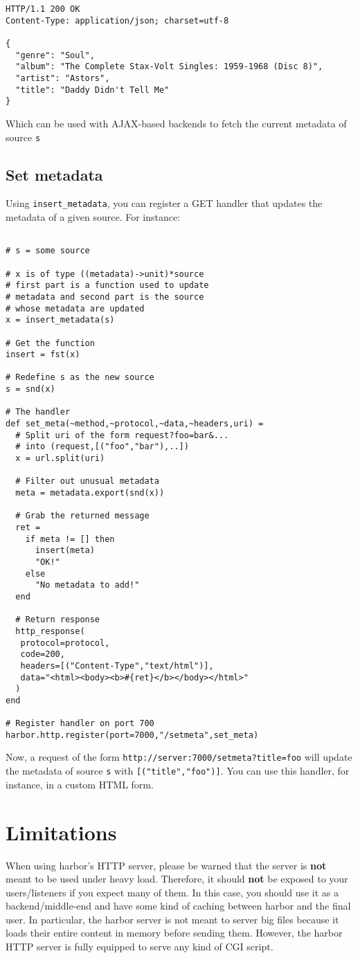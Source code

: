 \begin{verbatim}
HTTP/1.1 200 OK
Content-Type: application/json; charset=utf-8

{
  "genre": "Soul",
  "album": "The Complete Stax-Volt Singles: 1959-1968 (Disc 8)",
  "artist": "Astors",
  "title": "Daddy Didn't Tell Me"
}
\end{verbatim}
Which can be used with AJAX-based backends to fetch the current 
metadata of source \verb+s+

\subsection{Set metadata}
Using \verb+insert_metadata+, you can register a GET handler that
updates the metadata of a given source. For instance:

\begin{verbatim}

# s = some source

# x is of type ((metadata)->unit)*source
# first part is a function used to update
# metadata and second part is the source 
# whose metadata are updated
x = insert_metadata(s)

# Get the function
insert = fst(x)

# Redefine s as the new source
s = snd(x)

# The handler
def set_meta(~method,~protocol,~data,~headers,uri) =
  # Split uri of the form request?foo=bar&...
  # into (request,[("foo","bar"),..])
  x = url.split(uri)

  # Filter out unusual metadata
  meta = metadata.export(snd(x))
  
  # Grab the returned message
  ret =
    if meta != [] then
      insert(meta)
      "OK!"
    else
      "No metadata to add!"
  end

  # Return response
  http_response(
   protocol=protocol,
   code=200,
   headers=[("Content-Type","text/html")],
   data="<html><body><b>#{ret}</b></body></html>"
  )
end

# Register handler on port 700
harbor.http.register(port=7000,"/setmeta",set_meta)
\end{verbatim}
Now, a request of the form \verb+http://server:7000/setmeta?title=foo+
will update the metadata of source \verb+s+ with \verb+[("title","foo")]+. You
can use this handler, for instance, in a custom HTML form.

\section{Limitations}
When using harbor's HTTP server, please be warned that the server is 
\textbf{not} meant to be used under heavy load. Therefore, it should \textbf{not}
be exposed to your users/listeners if you expect many of them. In this
case, you should use it as a backend/middle-end and have some kind of 
caching between harbor and the final user. In particular, the harbor server
is not meant to server big files because it loads their entire content in 
memory before sending them. However, the harbor HTTP server is fully equipped 
to serve any kind of CGI script. 

